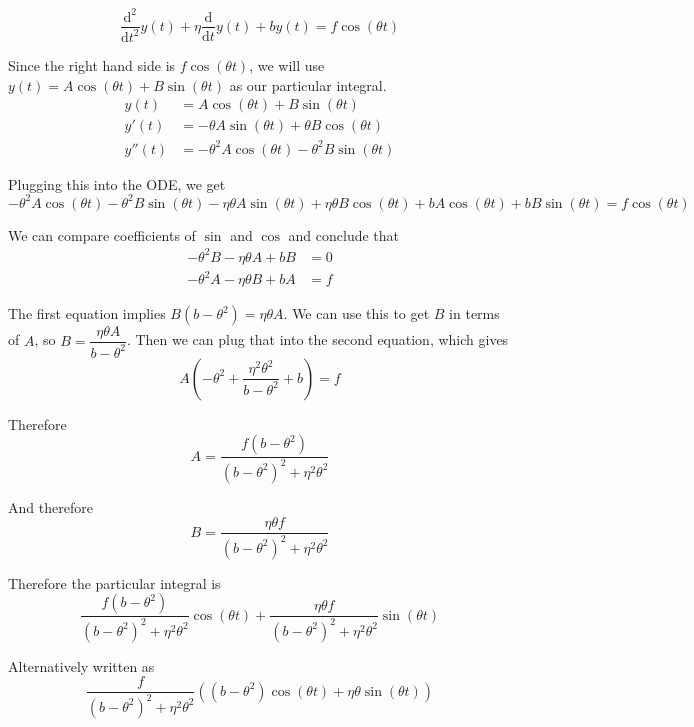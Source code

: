 \documentclass[a4paper]{article}
\begin{document}

$$\frac{\mathrm d^2}{\mathrm d t^2} y(t) + \eta \frac{\mathrm d}{\mathrm d t} y(t) + b y(t) = f \cos(\theta t)$$

Since the right hand side is $f \cos(\theta t)$, we will use $y(t) = A \cos(\theta t) + B \sin(\theta t)$ as our particular integral.
\begin{align*}
	y(t)   &= A \cos(\theta t) + B \sin(\theta t)\\
	y'(t)  &= -\theta A \sin(\theta t) + \theta B \cos(\theta t)\\
	y''(t) &= -\theta^2 A \cos(\theta t) - \theta^2 B \sin(\theta t)
\end{align*}

Plugging this into the ODE, we get $$-\theta^2 A \cos(\theta t) - \theta^2 B \sin(\theta t) -\eta\theta A \sin(\theta t) + \eta\theta B \cos(\theta t) + bA \cos(\theta t) + bB \sin(\theta t) = f \cos(\theta t)$$

We can compare coefficients of $\sin$ and $\cos$ and conclude that \begin{align*}
	-\theta^2 B - \eta\theta A + bB &= 0\\
	-\theta^2 A - \eta\theta B + bA &= f
\end{align*}

The first equation implies $B(b - \theta^2) = \eta\theta A$. We can use this to get $B$ in terms of $A$, so $B = \dfrac{\eta\theta A}{b - \theta^2}$. Then we can plug that into the second equation, which gives $$A \left(-\theta^2 + \frac{\eta^2 \theta^2}{b - \theta^2} + b\right) = f$$

Therefore $$A = \frac{f (b - \theta^2)}{(b - \theta^2)^2 + \eta^2 \theta^2}$$

And therefore $$B = \frac{\eta \theta f}{(b - \theta^2)^2 + \eta^2 \theta^2}$$

Therefore the particular integral is $$\frac{f (b - \theta^2)}{(b - \theta^2)^2 + \eta^2 \theta^2} \cos(\theta t) + \frac{\eta \theta f}{(b - \theta^2)^2 + \eta^2 \theta^2} \sin (\theta t)$$

Alternatively written as $$\frac{f}{(b - \theta^2)^2 + \eta^2 \theta^2} \left( (b - \theta^2) \cos(\theta t) + \eta \theta \sin(\theta t) \right)$$
\end{document}
